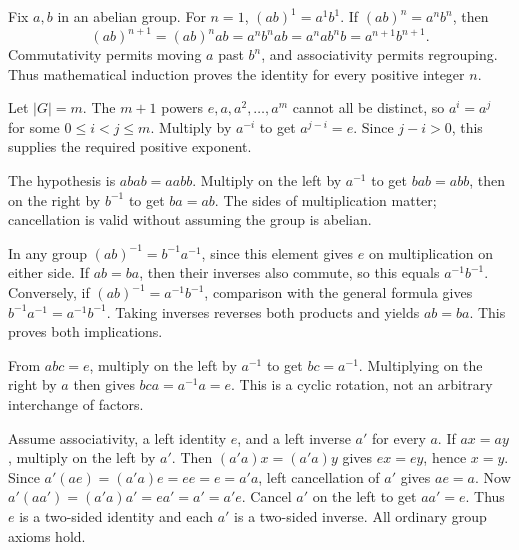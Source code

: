 
Fix $a,b$ in an abelian group. For $n=1$, $(ab)^1=a^1b^1$. If $(ab)^n=a^n b^n$, then
\[(ab)^{n+1}=(ab)^n ab=a^n b^n ab=a^n a b^n b=a^{n+1}b^{n+1}.
\]
Commutativity permits moving $a$ past $b^n$, and associativity permits regrouping. Thus mathematical induction proves the identity for every positive integer $n$.


Let $|G|=m$. The $m+1$ powers $e,a,a^2,\ldots,a^m$ cannot all be distinct, so $a^i=a^j$ for some $0\le i<j\le m$. Multiply by $a^{-i}$ to get $a^{j-i}=e$. Since $j-i>0$, this supplies the required positive exponent.


The hypothesis is $abab=aabb$. Multiply on the left by $a^{-1}$ to get $bab=abb$, then on the right by $b^{-1}$ to get $ba=ab$. The sides of multiplication matter; cancellation is valid without assuming the group is abelian.


In any group $(ab)^{-1}=b^{-1}a^{-1}$, since this element gives $e$ on multiplication on either side. If $ab=ba$, then their inverses also commute, so this equals $a^{-1}b^{-1}$. Conversely, if $(ab)^{-1}=a^{-1}b^{-1}$, comparison with the general formula gives $b^{-1}a^{-1}=a^{-1}b^{-1}$. Taking inverses reverses both products and yields $ab=ba$. This proves both implications.


From $abc=e$, multiply on the left by $a^{-1}$ to get $bc=a^{-1}$. Multiplying on the right by $a$ then gives $bca=a^{-1}a=e$. This is a cyclic rotation, not an arbitrary interchange of factors.


Assume associativity, a left identity $e$, and a left inverse $a'$ for every $a$.
 If $ax=ay$, multiply on the left by $a'$. Then $(a'a)x=(a'a)y$ gives $ex=ey$, hence $x=y$.
 Since $a'(ae)=(a'a)e=ee=e=a'a$, left cancellation of $a'$ gives $ae=a$.
 Now $a'(aa')=(a'a)a'=ea'=a'=a'e$. Cancel $a'$ on the left to get $aa'=e$. Thus $e$ is a two-sided identity and each $a'$ is a two-sided inverse. All ordinary group axioms hold.

